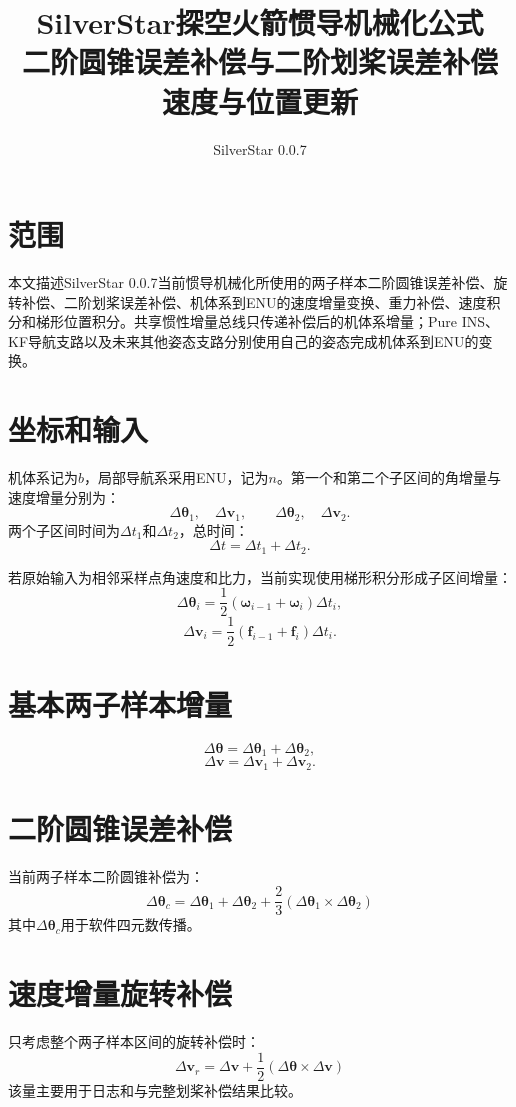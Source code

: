 \documentclass[12pt,a4paper]{ctexart}
\title{SilverStar探空火箭惯导机械化公式\\二阶圆锥误差补偿与二阶划桨误差补偿\\速度与位置更新}
\author{SilverStar 0.0.7}
\date{}
\newcommand{\vect}[1]{\bm{#1}}
\newcommand{\cross}{\times}
\begin{document}
\maketitle
\tableofcontents
\newpage

\section{范围}
本文描述SilverStar 0.0.7当前惯导机械化所使用的两子样本二阶圆锥误差补偿、旋转补偿、二阶划桨误差补偿、机体系到ENU的速度增量变换、重力补偿、速度积分和梯形位置积分。共享惯性增量总线只传递补偿后的机体系增量；Pure INS、KF导航支路以及未来其他姿态支路分别使用自己的姿态完成机体系到ENU的变换。

\section{坐标和输入}
机体系记为$b$，局部导航系采用ENU，记为$n$。第一个和第二个子区间的角增量与速度增量分别为：
\[
\Delta\vect{\theta}_1,\quad \Delta\vect{v}_1,
\qquad
\Delta\vect{\theta}_2,\quad \Delta\vect{v}_2.
\]
两个子区间时间为$\Delta t_1$和$\Delta t_2$，总时间：
\[
\Delta t=\Delta t_1+\Delta t_2.
\]

若原始输入为相邻采样点角速度和比力，当前实现使用梯形积分形成子区间增量：
\[
\Delta\vect{\theta}_i=\frac{1}{2}
(\vect{\omega}_{i-1}+\vect{\omega}_{i})\Delta t_i,
\]
\[
\Delta\vect{v}_i=\frac{1}{2}
(\vect{f}_{i-1}+\vect{f}_{i})\Delta t_i.
\]

\section{基本两子样本增量}
\[
\Delta\vect{\theta}=\Delta\vect{\theta}_1+\Delta\vect{\theta}_2,
\]
\[
\Delta\vect{v}=\Delta\vect{v}_1+\Delta\vect{v}_2.
\]

\section{二阶圆锥误差补偿}
当前两子样本二阶圆锥补偿为：
\[
\boxed{
\Delta\vect{\theta}_{c}
=
\Delta\vect{\theta}_1
+
\Delta\vect{\theta}_2
+
\frac{2}{3}
\left(
\Delta\vect{\theta}_1\cross\Delta\vect{\theta}_2
\right)
}
\]
其中$\Delta\vect{\theta}_{c}$用于软件四元数传播。

\section{速度增量旋转补偿}
只考虑整个两子样本区间的旋转补偿时：
\[
\boxed{
\Delta\vect{v}_{r}
=
\Delta\vect{v}
+
\frac{1}{2}
\left(
\Delta\vect{\theta}\cross\Delta\vect{v}
\right)
}
\]
该量主要用于日志和与完整划桨补偿结果比较。
\end{document}
